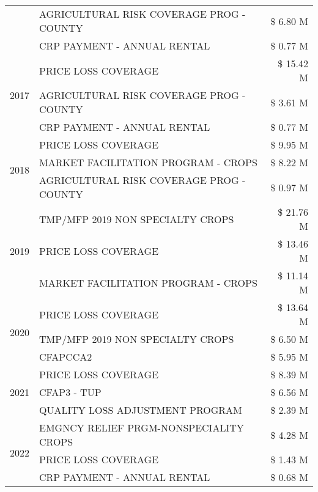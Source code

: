 \begin{tabular}{llr}
 & AGRICULTURAL RISK COVERAGE PROG - COUNTY & \$ 6.80 M \\
 & CRP PAYMENT - ANNUAL RENTAL & \$ 0.77 M \\
\cline{1-3}
\multirow[t]{3}{*}{2017} & PRICE LOSS COVERAGE & \$ 15.42 M \\
 & AGRICULTURAL RISK COVERAGE PROG - COUNTY & \$ 3.61 M \\
 & CRP PAYMENT - ANNUAL RENTAL & \$ 0.77 M \\
\cline{1-3}
\multirow[t]{3}{*}{2018} & PRICE LOSS COVERAGE & \$ 9.95 M \\
 & MARKET FACILITATION PROGRAM - CROPS & \$ 8.22 M \\
 & AGRICULTURAL RISK COVERAGE PROG - COUNTY & \$ 0.97 M \\
\cline{1-3}
\multirow[t]{3}{*}{2019} & TMP/MFP 2019 NON SPECIALTY CROPS & \$ 21.76 M \\
 & PRICE LOSS COVERAGE & \$ 13.46 M \\
 & MARKET FACILITATION PROGRAM - CROPS & \$ 11.14 M \\
\cline{1-3}
\multirow[t]{3}{*}{2020} & PRICE LOSS COVERAGE & \$ 13.64 M \\
 & TMP/MFP 2019 NON SPECIALTY CROPS & \$ 6.50 M \\
 & CFAPCCA2 & \$ 5.95 M \\
\cline{1-3}
\multirow[t]{3}{*}{2021} & PRICE LOSS COVERAGE & \$ 8.39 M \\
 & CFAP3 - TUP & \$ 6.56 M \\
 & QUALITY LOSS ADJUSTMENT PROGRAM & \$ 2.39 M \\
\cline{1-3}
\multirow[t]{3}{*}{2022} & EMGNCY RELIEF PRGM-NONSPECIALITY CROPS & \$ 4.28 M \\
 & PRICE LOSS COVERAGE & \$ 1.43 M \\
 & CRP PAYMENT - ANNUAL RENTAL & \$ 0.68 M \\
\cline{1-3}
\bottomrule
\end{tabular}

